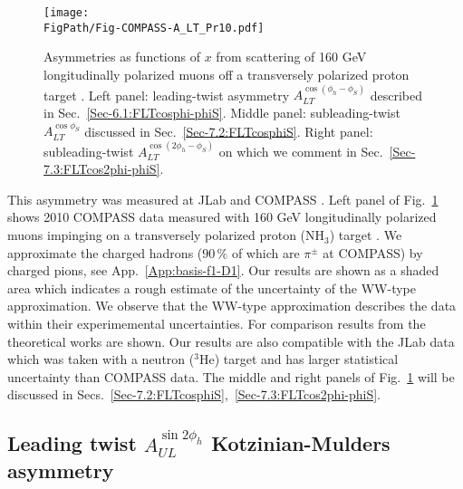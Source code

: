 \documentclass[a4paper,11pt]{article}
\newcommand*{\FigPath}{./figs}%
\begin{document}
\begin{figure}[b!]
\centering
\texttt{[image: \\FigPath/Fig-COMPASS-A\_LT\_Pr10.pdf]}
	\caption{\label{g1t_jlab} 
	Asymmetries as functions of $x$ from scattering of 160 GeV
	longitudinally polarized muons off a transversely polarized 
	proton target \cite{Parsamyan:2015dfa}.
	Left panel: 
	leading-twist asymmetry $A_{LT}^{\cos(\phi_h-\phi_S)}$ 
	described in Sec.~\ref{Sec-6.1:FLTcosphi-phiS}.
	Middle panel: 
	subleading-twist $A_{LT}^{\cos\phi_S}$ 
	discussed in Sec.~\ref{Sec-7.2:FLTcosphiS}.
	Right panel: 
	subleading-twist $A_{LT}^{\cos(2\phi_h-\phi_S)}$
	on which we comment in Sec.~\ref{Sec-7.3:FLTcos2phi-phiS}.}
\end{figure}

This asymmetry was measured at JLab and COMPASS 
\cite{Huang:2011bc,Parsamyan:2015dfa}. Left panel of Fig.~\ref{g1t_jlab} 
shows 2010 COMPASS data \cite{Parsamyan:2015dfa} measured with 160 GeV 
longitudinally polarized muons impinging on a transversely polarized proton 
(NH$_3$) target \cite{Goertz:2002vv}. We approximate the charged hadrons
($90\,\%$ of which are $\pi^\pm$ at COMPASS) by charged pions, see 
App.~\ref{App:basis-f1-D1}.
Our results are shown as a shaded area which indicates a rough estimate
of the uncertainty of the WW-type approximation.
We observe that the WW-type approximation describes the data within 
their experimemental uncertainties.
For comparison results from the theoretical works 
\cite{Kotzinian:2006dw,Kotzinian:2008fe,Boffi:2009sh} are shown.
Our results are also compatible with the JLab data which was 
taken with a neutron ($^3$He) target \cite{Huang:2011bc} and has 
larger statistical uncertainty than COMPASS data. The middle and right 
panels of Fig.~\ref{g1t_jlab} will be discussed in 
Secs.~\ref{Sec-7.2:FLTcosphiS},~\ref{Sec-7.3:FLTcos2phi-phiS}.



\newpage

\subsection{\boldmath 
	Leading twist $A_{UL}^{\sin2\phi_h}$ Kotzinian-Mulders  asymmetry}
	\label{Sec-6.2:FULsin2phi}
\end{document}
